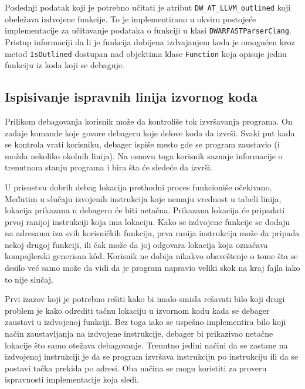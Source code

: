 \documentclass[12pt,oneside]{memoir}
\begin{document}
Poslednji podatak koji je potrebno učitati je atribut \verb|DW_AT_LLVM_outlined| koji obeležava izdvojene funkcije.
To je implementirano u okviru postojeće implementacije za učitavanje podataka o funkciji u klasi \verb|DWARFASTParserClang|.
Pristup informaciji da li je funkcija dobijena izdvajanjem koda je omogućen kroz metod \verb|IsOutlined| dostupan nad objektima klase \verb|Function| koja opisuje jednu funkciju iz koda koji se debaguje.

\subsection{Ispisivanje ispravnih linija izvornog koda}

\label{sec:debugger_line_number}

Prilikom debagovanja korisnik može da kontroliše tok izvršavanja programa.
On zadaje komande koje govore debageru koje delove koda da izvrši.
Svaki put kada se kontrola vrati korisniku, debager ispiše mesto gde se program zaustavio (i možda nekoliko okolnih linija).
Na osnovu toga korisnik saznaje informacije o trenutnom stanju programa i bira šta će sledeće da izvrši.

U prisustvu dobrih debag lokacija prethodni proces funkcioniše očekivano.
Međutim u slučaju izvojenih instrukcija koje nemaju vrednost u tabeli linija, lokacija prikazana u debageru će biti netačna.
Prikazana lokacija će pripadati prvoj ranijoj instrukciji koja ima lokaciju.
Kako se izdvojene funkcije se dodaju na adresama iza svih korisničkih funkcija, prva ranija instrukcija može da pripada nekoj drugoj funkciji, ili čak može da joj odgovara lokacija koja označava kompajlerski generisan k\^od.
Korisnik ne dobija nikakvo obaveštenje o tome šta se desilo već samo može da vidi da je program napravio veliki skok na kraj fajla iako to nije slučaj.


Prvi izazov koji je potrebno rešiti kako bi imalo smisla rešavati bilo koji drugi problem je kako odrediti tačnu lokaciju u izvornom kodu kada se debager zaustavi u izdvojenoj funkciji.
Bez toga iako se uspešno implementira bilo koji način zaustavljanja na izdvojene instrukcije, debager bi prikazivao netačne lokacije što samo otežava debagovanje.
Trenutno jedini načini da se zastane na izdvojenoj instrukciji je da se program izvršava instrukciju po instrukciju ili da se postavi tačka prekida po adresi.
Oba načina se mogu koristiti za proveru ispravnosti implementacije koja sledi.
\end{document}
